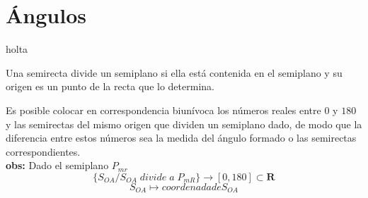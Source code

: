 \chapter{Ángulos}

\begin{axioma}
holta
\end{axioma}

\begin{def.}
Una semirecta divide un semiplano si ella está contenida en el semiplano y su origen es un punto de la recta que lo determina.
\end{def.}

\begin{tcolorbox}
\begin{axioma}
Es posible colocar en correspondencia biunívoca los números reales entre $0$ y $180$ y las semirectas del mismo origen que dividen un semiplano dado, de modo que la diferencia entre estos números sea la medida del ángulo formado o las semirectas correspondientes.\\
\textbf{obs:} Dado el semiplano $P_{mr}$
$$\lbrace S_{OA} / S_{OA} \; divide \; a \; P_{mR} \rbrace \rightarrow [0,180] \subset \mathbf{R}$$
$$S_{OA} \longmapsto coordenada de S_{OA}$$
\end{axioma}
\end{tcolorbox}

